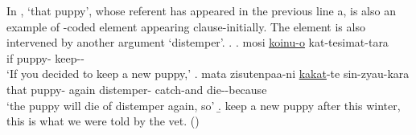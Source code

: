 In \Next,
 `that puppy',
whose referent has appeared in the previous line a,
is also an example of -coded element appearing clause-initially.
The element is also intervened by another argument `distemper'.
%
\ex.
	\ag. mosi \ul{\ul{koinu-o}} kat-tesimat-tara \\
		if puppy- keep-- \\
		`If you decided to keep a new puppy,'
	\bg.   mata zisutenpaa-ni \ul{kakat}-te sin-zyau-kara \\
			that puppy- again distemper- catch-and die--because \\
			`the puppy will die of distemper again, so'
	\b. keep a new puppy after this winter, this is what we were told by the vet.
	\hfill{()}
%

